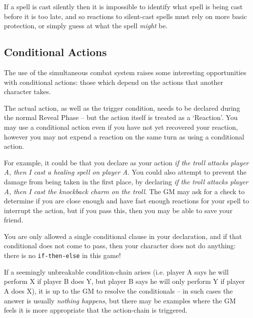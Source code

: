If a spell is cast silently then it is impossible to identify what spell is being cast before it is too late, and so reactions to silent-cast spells must rely on more basic protection, or simply guess at what the spell {\it might} be. 



\subsection{Conditional Actions}

The use of the simultaneous combat system raises some interesting opportunities with conditional actions: those which depend on the actions that another character takes.

The actual action, as well as the trigger condition, needs to be declared during the normal Reveal Phase -- but the action itself is treated as a `Reaction'. You may use a conditional action even if you have not yet recovered your reaction, however you may not expend a reaction on the same turn as using a conditional action. 

For example, it could be that you declare as your action \textit{if the troll attacks player A, then I cast a healing spell on player A}. You could also attempt to prevent the damage from being taken in the first place, by declaring \textit{if the troll attacks player A, then I cast the knockback charm on the troll}. The GM may ask for a check to determine if you are close enough and have fast enough reactions for your spell to interrupt the action, but if you pass this, then you may be able to save your friend.

You are only allowed a single conditional clause in your declaration, and if that conditional does not come to pass, then your character does not do anything: there is no \verb|if-then-else| in this game!

If a seemingly unbreakable condition-chain arises (i.e. player A says he will perform X if player B does Y, but player B says he will only perform Y if player A does X), it is up to the GM to resolve the conditionals -- in such cases the answer is usually \textit{nothing happens}, but there may be examples where the GM feels it is more appropriate that the action-chain is triggered. 


